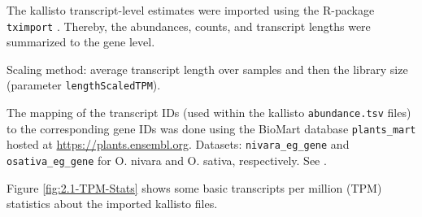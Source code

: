 The kallisto transcript-level estimates were imported using the R-package \verb|tximport| \autocite{R-tximport, tximport2015}. Thereby, the  abundances, counts, and transcript lengths were summarized to the gene level.

Scaling method: average transcript length over samples and then the library size (parameter \verb|lengthScaledTPM|).

The mapping of the transcript IDs (used within the kallisto \verb|abundance.tsv| files) to the corresponding gene IDs was done using the BioMart database \verb|plants_mart| hosted at \url{https://plants.ensembl.org}. Datasets: \verb|nivara_eg_gene| and \verb|osativa_eg_gene| for O. nivara and O. sativa, respectively. See \autocite{R-biomaRt, biomaRt2009}.

Figure \ref{fig:2.1-TPM-Stats} shows some basic transcripts per million (TPM) statistics about the imported kallisto files.

